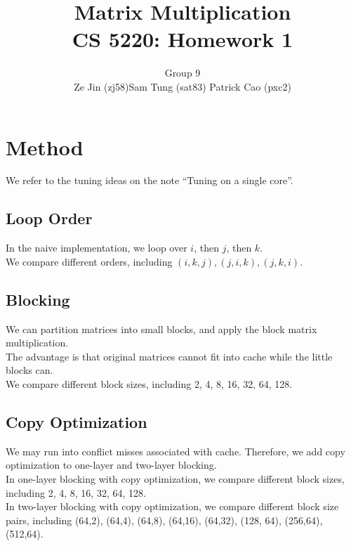 \documentclass[12pt]{article}
\numberwithin{equation}{section}
\begin{document}
\title{\bf{Matrix Multiplication \\ CS 5220: Homework 1}}

\author{Group 9 \\ Ze Jin (zj58)\quad Sam Tung (sat83) \quad Patrick Cao (pxc2) \\}

\date{ }

\maketitle





\section{Method}

We refer to the tuning ideas on the note ``Tuning on a single core''. 

\subsection{Loop Order}

In the naive implementation, we loop over $i$, then $j$, then $k$.
\\
We compare different orders, including $(i,k,j), (j,i,k), (j,k,i)$.

\subsection{Blocking}

We can partition matrices into small blocks, and apply the block matrix multiplication.
\\
The advantage is that original matrices cannot fit into cache while the little blocks can.
\\
We compare different block sizes, including 2, 4, 8, 16, 32, 64, 128.

\subsection{Copy Optimization}

We may run into conflict misses associated with cache. Therefore, we add copy optimization to one-layer and two-layer blocking.
\\
In one-layer blocking with copy optimization, we compare different block sizes, including 2, 4, 8, 16, 32, 64, 128.
\\
In two-layer blocking with copy optimization, we compare different block size pairs, including (64,2), (64,4), (64,8), (64,16), (64,32), (128, 64), (256,64), (512,64).
\end{document}
